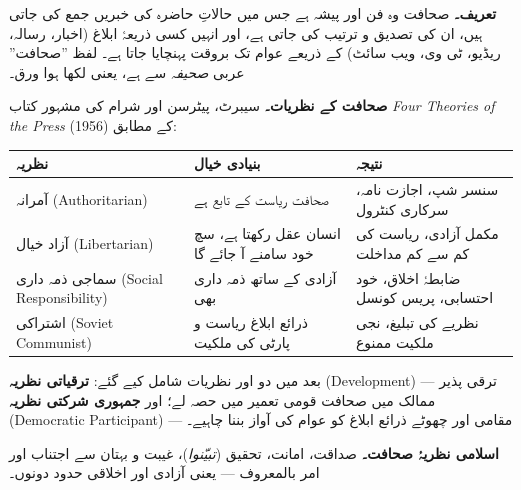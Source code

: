 \begin{hal}
\textbf{تعریف۔} صحافت وہ فن اور پیشہ ہے جس میں حالاتِ حاضرہ کی خبریں جمع کی
جاتی ہیں، ان کی تصدیق و ترتیب کی جاتی ہے، اور انہیں کسی ذریعۂ ابلاغ (اخبار،
رسالہ، ریڈیو، ٹی وی، ویب سائٹ) کے ذریعے عوام تک بروقت پہنچایا جاتا ہے۔ لفظ
''صحافت'' عربی \emph{صحیفہ} سے ہے، یعنی لکھا ہوا ورق۔

\medskip
\textbf{صحافت کے نظریات۔} سیبرٹ، پیٹرسن اور شرام کی مشہور کتاب
\textenglish{\emph{Four Theories of the Press}} (\textenglish{1956}) کے مطابق:

\begin{center}
\begin{tabular}{@{}p{3.4cm} p{5.4cm} p{5.6cm}@{}}
\toprule
\textbf{نظریہ} & \textbf{بنیادی خیال} & \textbf{نتیجہ} \\
\midrule
آمرانہ \newline \textenglish{(Authoritarian)}
  & صحافت ریاست کے تابع ہے & سنسر شپ، اجازت نامہ، سرکاری کنٹرول \\
آزاد خیال \newline \textenglish{(Libertarian)}
  & انسان عقل رکھتا ہے، سچ خود سامنے آ جائے گا & مکمل آزادی، ریاست کی کم سے کم مداخلت \\
سماجی ذمہ داری \newline \textenglish{(Social Responsibility)}
  & آزادی کے ساتھ ذمہ داری بھی & ضابطۂ اخلاق، خود احتسابی، پریس کونسل \\
اشتراکی \newline \textenglish{(Soviet Communist)}
  & ذرائع ابلاغ ریاست و پارٹی کی ملکیت & نظریے کی تبلیغ، نجی ملکیت ممنوع \\
\bottomrule
\end{tabular}
\end{center}

بعد میں دو اور نظریات شامل کیے گئے: \textbf{ترقیاتی نظریہ}
(\textenglish{Development}) --- ترقی پذیر ممالک میں صحافت قومی تعمیر میں
حصہ لے؛ اور \textbf{جمہوری شرکتی نظریہ}
(\textenglish{Democratic Participant}) --- مقامی اور چھوٹے ذرائع ابلاغ کو
عوام کی آواز بننا چاہیے۔

\medskip
\textbf{اسلامی نظریۂ صحافت۔} صداقت، امانت، تحقیق (\emph{تبیّنوا})، غیبت و
بہتان سے اجتناب اور امر بالمعروف --- یعنی آزادی اور اخلاقی حدود دونوں۔

\end{hal}

